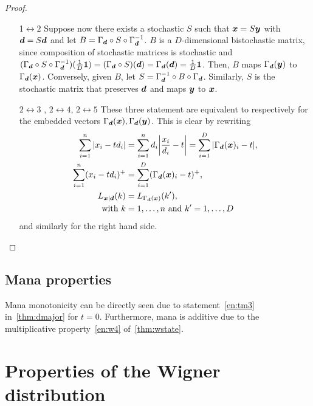 \begin{proof}
    \begin{enumerate}
        \item[1$\leftrightarrow2$]
        Suppose now there exists a stochastic $S$ such that $\bm{x} = S\bm{y}$ with $\bm{d} = S\bm{d}$ and let $B = \Gamma_{\bm{d}} \circ S \circ \Gamma_{\bm{d}}^{-1}$.
        $B$ is a $D$-dimensional bistochastic matrix, since composition of stochastic matrices is stochastic and $(\Gamma_{\bm{d}} \circ S \circ \Gamma_{\bm{d}}^{-1}) (\frac{1}{D}\bm{1}) = (\Gamma_{\bm{d}} \circ S) (\bm{d}) = \Gamma_{\bm{d}}(\bm{d}) = \frac{1}{D}\bm{1}$. Then, $B$ maps $\Gamma_{\bm{d}}({\bm{y}})$ to $\Gamma_{\bm{d}}({\bm{x}})$.
        Conversely, given $B$, let $S = \Gamma_{\bm{d}}^{-1} \circ B \circ \Gamma_{\bm{d}}$.
        Similarly, $S$ is the stochastic matrix that preserves $\bm{d}$ and maps $\bm{y}$ to $\bm{x}$.
        \item[$2\leftrightarrow3$]\hspace{-5pt}, $2\leftrightarrow4$, $2\leftrightarrow5$ These three statement are equivalent to  respectively for the embedded vectors $\Gamma_{\bm{d}}({\bm{x}}), \Gamma_{\bm{d}}({\bm{y}})$.
        This is clear by rewriting
        \begin{align}
            \sum\limits_{i=1}^n \abs{x_i - t d_i} &= \sum\limits_{i=1}^n d_i \abs{\frac{x_i}{d_i} - t} = \sum\limits_{i=1}^D \abs{\Gamma_{\bm{d}}(\bm{x})_i - t}, \\
            \sum\limits_{i=1}^n (x_i - t d_i)^+ &= \sum\limits_{i=1}^D (\Gamma_{\bm{d}}(\bm{x})_i - t)^+, \\
            L_{\bm{x}|\bm{d}}(k) &= L_{\Gamma_{\bm{d}}(\bm{x})}(k'), \\
            \text{with}\ k&=1,\dots,n\ \text{and}\ k'=1,\dots,D \nonumber
        \end{align} 
        and similarly for the right hand side.
    \end{enumerate}
\end{proof}

\subsection{Mana properties}
Mana monotonicity can be directly seen due to statement~\ref{en:tm3} in~\cref{thm:dmajor} for $t=0$.
Furthermore, mana is additive due to the multiplicative property~\ref{en:w4} of~\cref{thm:wstate}.


\section{Properties of the Wigner distribution}
\label{app:wigner}

